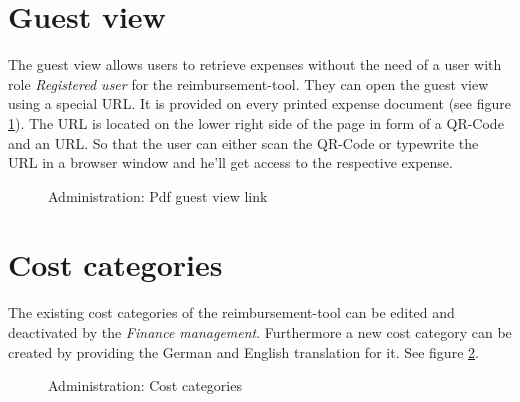 \section{Guest view}
The guest view allows users to retrieve expenses without the need of a user with role \textit{Registered user} for the reimbursement-tool. They can open the guest view using a special URL. It is provided on every printed expense document (see figure \ref{fig:pdf-web}). The URL is located on the lower right side of the page in form of a QR-Code and an URL. So that the user can either scan the QR-Code or typewrite the URL in a browser window and he'll get access to the respective expense.

\begin{figure}[H]
    \centering
    \caption{Administration: Pdf guest view link}
    \label{fig:pdf-web}
\end{figure}

\section{Cost categories}

The existing cost categories of the reimbursement-tool can be edited and deactivated by the \textit{Finance management}. Furthermore a new cost category can be created by providing the German and English translation for it. See figure \ref{fig:admin-costcategories}.

\begin{figure}[H]
    \centering
    \caption{Administration: Cost categories}
    \label{fig:admin-costcategories}
\end{figure}

